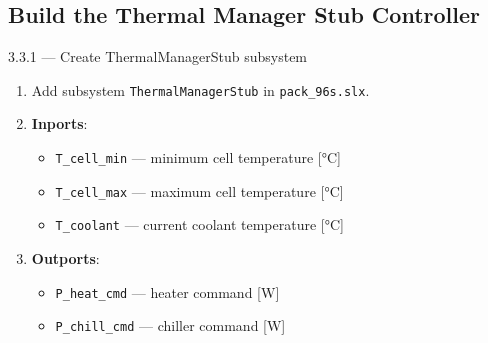 \documentclass[11pt,a4paper]{article}
\begin{document}
\subsection{Build the Thermal Manager Stub Controller}

\begin{guistep}{3.3.1 — Create ThermalManagerStub subsystem}
\begin{enumerate}
    \item Add subsystem \texttt{ThermalManagerStub} in \texttt{pack\_96s.slx}.
    \item \textbf{Inports}:
    \begin{itemize}
        \item \texttt{T\_cell\_min} — minimum cell temperature [\si{\degreeCelsius}]
        \item \texttt{T\_cell\_max} — maximum cell temperature [\si{\degreeCelsius}]
        \item \texttt{T\_coolant} — current coolant temperature [\si{\degreeCelsius}]
    \end{itemize}
    \item \textbf{Outports}:
    \begin{itemize}
        \item \texttt{P\_heat\_cmd} — heater command [W]
        \item \texttt{P\_chill\_cmd} — chiller command [W]
    \end{itemize}
\end{enumerate}
\end{guistep}
\end{document}
